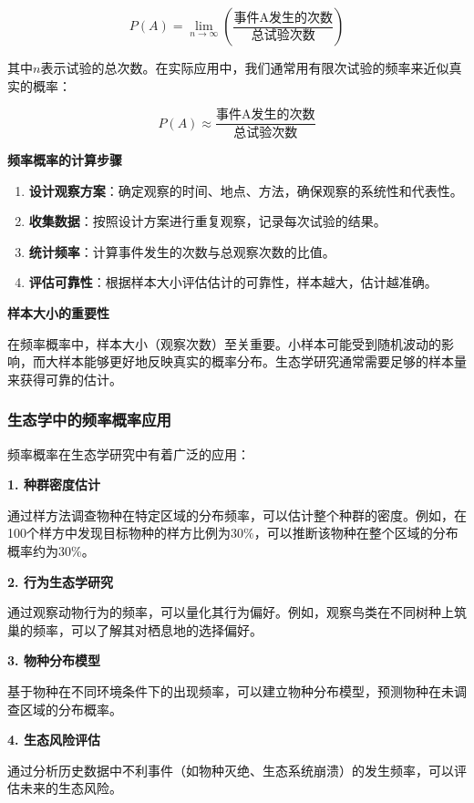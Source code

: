 \documentclass[
]{book}
\begin{document}
\[P(A) = \lim_{n \to \infty} \left( \frac{\text{事件A发生的次数}}{\text{总试验次数}} \right)\]

其中\(n\)表示试验的总次数。在实际应用中，我们通常用有限次试验的频率来近似真实的概率：

\[P(A) \approx \frac{\text{事件A发生的次数}}{\text{总试验次数}}\]

\textbf{频率概率的计算步骤}

\begin{enumerate}
\def\labelenumi{\arabic{enumi}.}
\item
  \textbf{设计观察方案}：确定观察的时间、地点、方法，确保观察的系统性和代表性。
\item
  \textbf{收集数据}：按照设计方案进行重复观察，记录每次试验的结果。
\item
  \textbf{统计频率}：计算事件发生的次数与总观察次数的比值。
\item
  \textbf{评估可靠性}：根据样本大小评估估计的可靠性，样本越大，估计越准确。
\end{enumerate}

\textbf{样本大小的重要性}

在频率概率中，样本大小（观察次数）至关重要。小样本可能受到随机波动的影响，而大样本能够更好地反映真实的概率分布。生态学研究通常需要足够的样本量来获得可靠的估计。

\hypertarget{ux751fux6001ux5b66ux4e2dux7684ux9891ux7387ux6982ux7387ux5e94ux7528}{%
\subsubsection{生态学中的频率概率应用}\label{ux751fux6001ux5b66ux4e2dux7684ux9891ux7387ux6982ux7387ux5e94ux7528}}

频率概率在生态学研究中有着广泛的应用：

\textbf{1. 种群密度估计}

通过样方法调查物种在特定区域的分布频率，可以估计整个种群的密度。例如，在100个样方中发现目标物种的样方比例为30\%，可以推断该物种在整个区域的分布概率约为30\%。

\textbf{2. 行为生态学研究}

通过观察动物行为的频率，可以量化其行为偏好。例如，观察鸟类在不同树种上筑巢的频率，可以了解其对栖息地的选择偏好。

\textbf{3. 物种分布模型}

基于物种在不同环境条件下的出现频率，可以建立物种分布模型，预测物种在未调查区域的分布概率。

\textbf{4. 生态风险评估}

通过分析历史数据中不利事件（如物种灭绝、生态系统崩溃）的发生频率，可以评估未来的生态风险。
\end{document}
